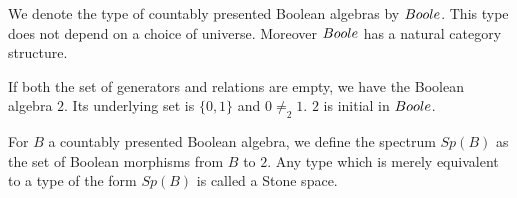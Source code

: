 \begin{remark}
  We denote the type of countably presented Boolean algebras by $\Boole$. 
  This type does not depend on a choice of universe. 
  Moreover $\Boole$ has a natural category structure. 
\end{remark}

\begin{example}
  If both the set of generators and relations are empty, we have the Boolean algebra $2$.
  Its underlying set is $\{0,1\}$ and $0\neq_2 1$.
  $2$ is initial in $\Boole$. 
\end{example}
%
\begin{definition}
  For $B$ a countably presented Boolean algebra, 
  we define the spectrum $Sp(B)$ as the set of Boolean morphisms from $B$ to $2$.
  Any type which is merely equivalent to a type of the form $Sp(B)$ is called a Stone space.
\end{definition}

